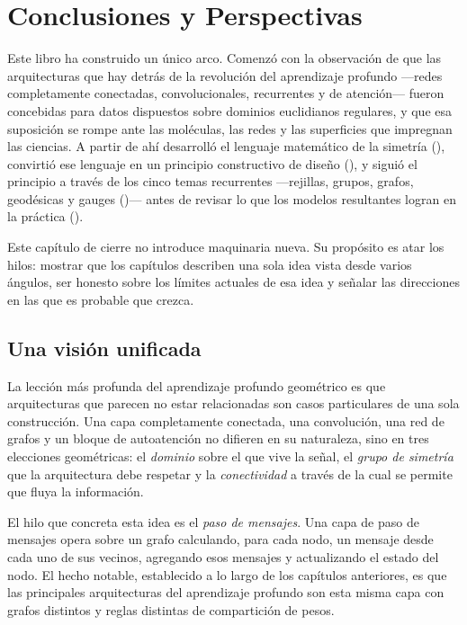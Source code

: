 \chapter{Conclusiones y Perspectivas}
\label{ch:conclusion}

\providecommand{\WL}{\textsc{wl}}

Este libro ha construido un \'unico arco. Comenz\'o con la observaci\'on de que
las arquitecturas que hay detr\'as de la revoluci\'on del aprendizaje profundo
---redes completamente conectadas, convolucionales, recurrentes y de
atenci\'on--- fueron concebidas para datos dispuestos sobre dominios euclidianos
regulares, y que esa suposici\'on se rompe ante las mol\'eculas, las redes y las
superficies que impregnan las ciencias. A partir de ah\'i desarroll\'o el
lenguaje matem\'atico de la simetr\'ia (), convirti\'o ese
lenguaje en un principio constructivo de dise\~no (), y sigui\'o
el principio a trav\'es de los cinco temas recurrentes ---rejillas, grupos,
grafos, geod\'esicas y gauges
()--- antes de revisar
lo que los modelos resultantes logran en la pr\'actica ().

Este cap\'itulo de cierre no introduce maquinaria nueva. Su prop\'osito es atar
los hilos: mostrar que los cap\'itulos describen una sola idea vista desde varios
\'angulos, ser honesto sobre los l\'imites actuales de esa idea y se\~nalar las
direcciones en las que es probable que crezca.

\section{Una visi\'on unificada}
\label{sec:concl:unified}

La lecci\'on m\'as profunda del aprendizaje profundo geom\'etrico es que
arquitecturas que parecen no estar relacionadas son casos particulares de una
sola construcci\'on. Una capa completamente conectada, una convoluci\'on, una red
de grafos y un bloque de autoatenci\'on no difieren en su naturaleza, sino en tres
elecciones geom\'etricas: el \emph{dominio} sobre el que vive la se\~nal, el
\emph{grupo de simetr\'ia} que la arquitectura debe respetar y la
\emph{conectividad} a trav\'es de la cual se permite que fluya la informaci\'on.

El hilo que concreta esta idea es el \emph{paso de mensajes}. Una capa de paso de
mensajes opera sobre un grafo calculando, para cada nodo, un mensaje desde cada
uno de sus vecinos, agregando esos mensajes y actualizando el estado del nodo. El
hecho notable, establecido a lo largo de los cap\'itulos anteriores, es que las
principales arquitecturas del aprendizaje profundo son esta misma capa con grafos
distintos y reglas distintas de compartici\'on de pesos.

